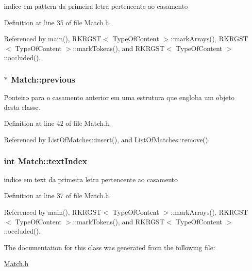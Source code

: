 indice em pattern da primeira letra pertencente ao casamento 



Definition at line 35 of file Match.\+h.



Referenced by main(), R\+K\+R\+G\+S\+T$<$ Type\+Of\+Content $>$\+::mark\+Arrays(), R\+K\+R\+G\+S\+T$<$ Type\+Of\+Content $>$\+::mark\+Tokens(), and R\+K\+R\+G\+S\+T$<$ Type\+Of\+Content $>$\+::occluded().

\hypertarget{classMatch_aec1e648b8eba83f2ed76182644ce91de}{
\subsubsection[{previous}]{$\ast$ Match\+::previous}}\label{classMatch_aec1e648b8eba83f2ed76182644ce91de}


Ponteiro para o casamento anterior em uma estrutura que engloba um objeto desta classe. 



Definition at line 42 of file Match.\+h.



Referenced by List\+Of\+Matches\+::insert(), and List\+Of\+Matches\+::remove().

\hypertarget{classMatch_aee534a2e3d23f7d069a618e1cb7b6343}{
\subsubsection[{text\+Index}]{\setlength{\rightskip}{0pt plus 5cm}int Match\+::text\+Index}}\label{classMatch_aee534a2e3d23f7d069a618e1cb7b6343}


indice em text da primeira letra pertencente ao casamento 



Definition at line 37 of file Match.\+h.



Referenced by main(), R\+K\+R\+G\+S\+T$<$ Type\+Of\+Content $>$\+::mark\+Arrays(), R\+K\+R\+G\+S\+T$<$ Type\+Of\+Content $>$\+::mark\+Tokens(), and R\+K\+R\+G\+S\+T$<$ Type\+Of\+Content $>$\+::occluded().



The documentation for this class was generated from the following file\+:\begin{DoxyCompactItemize}
\item 
\hyperlink{Match_8h}{Match.\+h}\end{DoxyCompactItemize}
